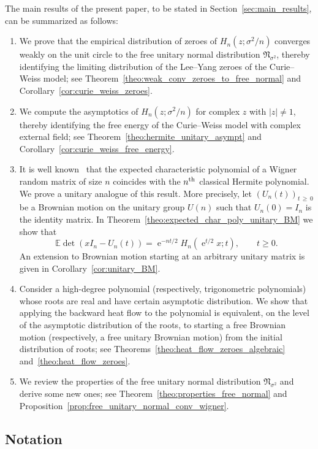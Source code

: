 \documentclass[AHL,Unicode,longabstracts,published]{cedram}
\DeclareMathOperator{\eee}{e}
\newcommand{\fnorm}{\mathfrak{N}}
\newcommand{\E}{\mathbb{E}}
\newcommand*{\relabel}{\renewcommand{\labelenumi}{(\theenumi)}}
\newcommand*{\alphenumi}{\renewcommand*{\theenumi}{\alph{enumi}}\relabel}
\begin{document}
The main results of the present paper, to be stated in Section~\ref{sec:main_results}, can be summarized as follows:
\begin{enumerate}\alphenumi
\item We prove that the empirical distribution of zeroes of $H_n(z; \sigma^2/n)$ converges weakly on the unit circle to the free unitary normal distribution $\fnorm_{\sigma^2}$, thereby identifying the limiting distribution of the Lee--Yang zeroes of the Curie--Weiss model; see Theorem~\ref{theo:weak_conv_zeroes_to_free_normal} and Corollary~\ref{cor:curie_weiss_zeroes}.
\item We compute the asymptotics of $H_n (z;\sigma^2/n)$ for complex $z$ with $|z|\neq 1$, thereby identifying the free energy of the Curie--Weiss model with complex external field; see Theorem~\ref{theo:hermite_unitary_asympt} and Corollary~\ref{cor:curie_weiss_free_energy}.
\item It is well known~\cite[Section~6.1.2]{potters_bouchaud_book} that the expected characteristic polynomial of a Wigner random matrix of size $n$ coincides with the $n^{\text{\normalfont th}}$ classical Hermite polynomial. We prove a unitary analogue of this result. More precisely, let $(U_n(t))_{t\,\geq\,0}$ be a Brownian motion on the unitary group $U(n)$ such that $U_n(0)=I_n$ is the identity matrix. In Theorem~\ref{theo:expected_char_poly_unitary_BM} we show that
\[
\E \det (x I_n - U_n(t))= \eee^{-nt/2} H_n\left(\eee^{t/2} x; t\right), \qquad t\geq 0.
\]
An extension to Brownian motion starting at an arbitrary unitary matrix is given in Corollary~\ref{cor:unitary_BM}.
\item Consider a high-degree polynomial (respectively, trigonometric polynomials) whose roots are real and have certain asymptotic distribution. We show that applying the backward heat flow to the polynomial is equivalent, on the level of the asymptotic distribution of the roots, to starting a free Brownian motion (respectively, a free unitary Brownian motion) from the initial distribution of roots; see Theorems~\ref{theo:heat_flow_zeroes_algebraic} and~\ref{theo:heat_flow_zeroes}.
\item We review the properties of the free unitary normal distribution $\fnorm_{\sigma^2}$ and derive some new ones; see Theorem~\ref{theo:properties_free_normal} and Proposition~\ref{prop:free_unitary_normal_conv_wigner}.
\end{enumerate}


\subsection*{Notation} 
\end{document}

